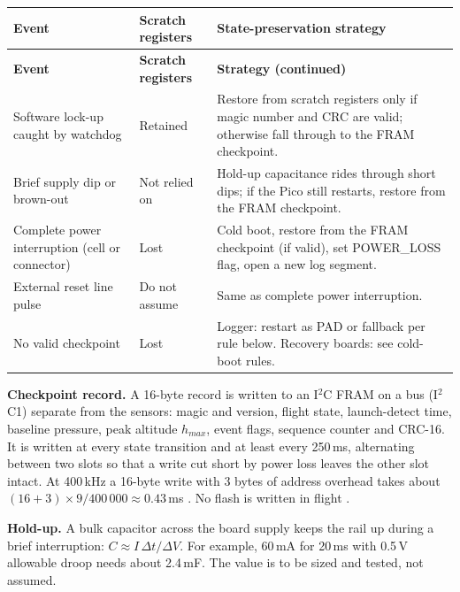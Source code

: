 \small
{}
\begin{longtable}{@{}L{35mm}L{36mm}L{70mm}@{}}
\toprule{}\textbf{Event}&\textbf{Scratch registers}&\textbf{State-preservation strategy}\\\midrule\endfirsthead
\toprule{}\textbf{Event}&\textbf{Scratch registers}&\textbf{Strategy (continued)}\\\midrule\endhead
\bottomrule\endlastfoot
Software lock-up caught by watchdog & Retained \cite{rp2040ds} & Restore from scratch registers only if magic number and CRC are valid; otherwise fall through to the FRAM checkpoint.\\
Brief supply dip or brown-out & Not relied on & Hold-up capacitance rides through short dips; if the Pico still restarts, restore from the FRAM checkpoint.\\
Complete power interruption (cell or connector) & Lost & Cold boot, restore from the FRAM checkpoint (if valid), set POWER\_LOSS flag, open a new log segment.\\
External reset line pulse & Do not assume & Same as complete power interruption.\\
No valid checkpoint & Lost & Logger: restart as PAD or fallback per rule below. Recovery boards: see cold-boot rules.\\
\end{longtable}
\normalsize

\textbf{Checkpoint record.} A 16-byte record is written to an I$^2$C FRAM \cite{fram} on a bus (I$^2$C1) separate from the sensors: magic and version, flight state, launch-detect time, baseline pressure, peak altitude $h_{max}$, event flags, sequence counter and CRC-16. It is written at every state transition and at least every 250\,ms, alternating between two slots so that a write cut short by power loss leaves the other slot intact. At 400\,kHz a 16-byte write with 3 bytes of address overhead takes about $(16+3)\times9/400\,000\approx0.43$\,ms \cite{i2cspec}. No flash is written in flight \cite{rp2040ds}.

\textbf{Hold-up.} A bulk capacitor across the board supply keeps the rail up during a brief interruption: $C\approx I\,\Delta t/\Delta V$. For example, 60\,mA for 20\,ms with 0.5\,V allowable droop needs about 2.4\,mF. The value is to be sized and tested, not assumed.

